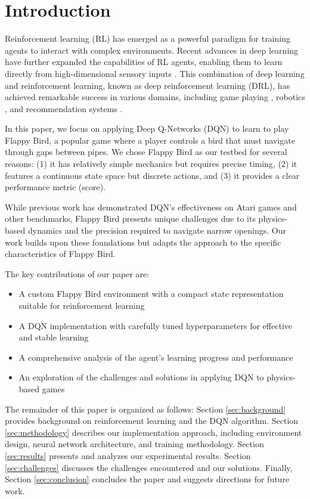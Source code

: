 \documentclass[conference]{IEEEtran}
\begin{document}
\section{Introduction}
Reinforcement learning (RL) has emerged as a powerful paradigm for training agents to interact with complex environments. Recent advances in deep learning have further expanded the capabilities of RL agents, enabling them to learn directly from high-dimensional sensory inputs \cite{mnih2015human}. This combination of deep learning and reinforcement learning, known as deep reinforcement learning (DRL), has achieved remarkable success in various domains, including game playing \cite{silver2017mastering}, robotics \cite{lillicrap2015continuous}, and recommendation systems \cite{zheng2018drn}.

In this paper, we focus on applying Deep Q-Networks (DQN) to learn to play Flappy Bird, a popular game where a player controls a bird that must navigate through gaps between pipes. We chose Flappy Bird as our testbed for several reasons: (1) it has relatively simple mechanics but requires precise timing, (2) it features a continuous state space but discrete actions, and (3) it provides a clear performance metric (score).

While previous work has demonstrated DQN's effectiveness on Atari games \cite{mnih2015human} and other benchmarks, Flappy Bird presents unique challenges due to its physics-based dynamics and the precision required to navigate narrow openings. Our work builds upon these foundations but adapts the approach to the specific characteristics of Flappy Bird.

The key contributions of our paper are:
\begin{itemize}
    \item A custom Flappy Bird environment with a compact state representation suitable for reinforcement learning
    \item A DQN implementation with carefully tuned hyperparameters for effective and stable learning
    \item A comprehensive analysis of the agent's learning progress and performance
    \item An exploration of the challenges and solutions in applying DQN to physics-based games
\end{itemize}

The remainder of this paper is organized as follows: Section \ref{sec:background} provides background on reinforcement learning and the DQN algorithm. Section \ref{sec:methodology} describes our implementation approach, including environment design, neural network architecture, and training methodology. Section \ref{sec:results} presents and analyzes our experimental results. Section \ref{sec:challenges} discusses the challenges encountered and our solutions. Finally, Section \ref{sec:conclusion} concludes the paper and suggests directions for future work.
\end{document}
